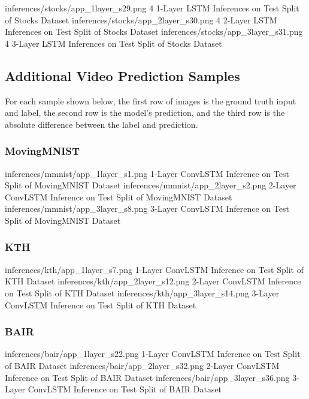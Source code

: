 \documentclass{scrartcl}
\begin{document}
\threefig
{inferences/stocks/app_1layer_s29.png}
{4 1-Layer LSTM Inferences on Test Split of Stocks Dataset}
{inferences/stocks/app_2layer_s30.png}
{4 2-Layer LSTM Inferences on Test Split of Stocks Dataset}
{inferences/stocks/app_3layer_s31.png}
{4 3-Layer LSTM Inferences on Test Split of Stocks Dataset}

\newpage
\subsection{Additional Video Prediction Samples}
\label{subsec:additional_video_inferences}

For each sample shown below, the first row of images is the ground truth input
and label, the second row is the model's prediction, and the third row is the
absolute difference between the label and prediction.

\subsubsection{MovingMNIST}
\label{subsubsec:additional_mmnist_inferences}

\threefig
{inferences/mmnist/app_1layer_s1.png}
{1-Layer ConvLSTM Inference on Test Split of MovingMNIST Dataset}
{inferences/mmnist/app_2layer_s2.png}
{2-Layer ConvLSTM Inference on Test Split of MovingMNIST Dataset}
{inferences/mmnist/app_3layer_s8.png}
{3-Layer ConvLSTM Inference on Test Split of MovingMNIST Dataset}

\subsubsection{KTH}
\label{subsubsec:additional_kth_inferences}

\threefig
{inferences/kth/app_1layer_s7.png}
{1-Layer ConvLSTM Inference on Test Split of KTH Dataset}
{inferences/kth/app_2layer_s12.png}
{2-Layer ConvLSTM Inference on Test Split of KTH Dataset}
{inferences/kth/app_3layer_s14.png}
{3-Layer ConvLSTM Inference on Test Split of KTH Dataset}

\subsubsection{BAIR}
\label{subsubsec:additional_bair_inferences}

\threefig
{inferences/bair/app_1layer_s22.png}
{1-Layer ConvLSTM Inference on Test Split of BAIR Dataset}
{inferences/bair/app_2layer_s32.png}
{2-Layer ConvLSTM Inference on Test Split of BAIR Dataset}
{inferences/bair/app_3layer_s36.png}
{3-Layer ConvLSTM Inference on Test Split of BAIR Dataset}
\end{document}
